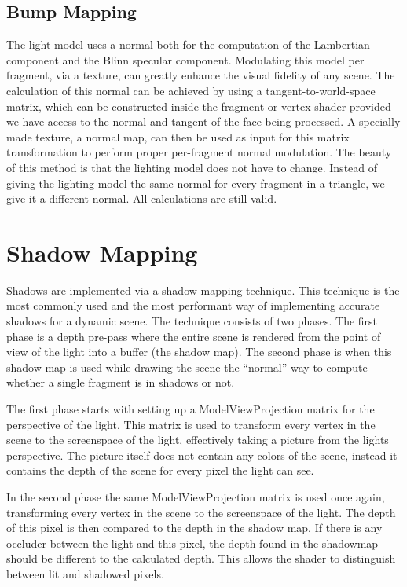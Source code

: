 \subsection{Bump Mapping}
The light model uses a normal both for the computation of the Lambertian component and the Blinn specular component. Modulating this model per fragment, via a texture, can greatly enhance the visual fidelity of any scene. The calculation of this normal can be achieved by using a tangent-to-world-space matrix, which can be constructed inside the fragment or vertex shader provided we have access to the normal and tangent of the face being processed. A specially made texture, a normal map, can then be used as input for this matrix transformation to perform proper per-fragment normal modulation. The beauty of this method is that the lighting model does not have to change. Instead of giving the lighting model the same normal for every fragment in a triangle, we give it a different normal. All calculations are still valid.

\section{Shadow Mapping}
Shadows are implemented via a shadow-mapping technique. This technique is the most commonly used and the most performant way of implementing accurate shadows for a dynamic scene. The technique consists of two phases. The first phase is  a depth pre-pass where the entire scene is rendered from the point of view of the light into a buffer (the shadow map). The second phase is when this shadow map is used while drawing the scene the ``normal'' way to compute whether a single fragment is in shadows or not.

The first phase starts with setting up a ModelViewProjection matrix for the perspective of the light. This matrix is used to transform every vertex in the scene to the screenspace of the light, effectively taking a picture from the lights perspective. The picture itself does not contain any colors of the scene, instead it contains the depth of the scene for every pixel the light can see.

In the second phase the same ModelViewProjection matrix is used once again, transforming every vertex in the scene to the screenspace of the light. The depth of this pixel is then compared to the depth in the shadow map. If there is any occluder between the light and this pixel, the depth found in the shadowmap should be different to the calculated depth. This allows the shader to distinguish between lit and shadowed pixels.

